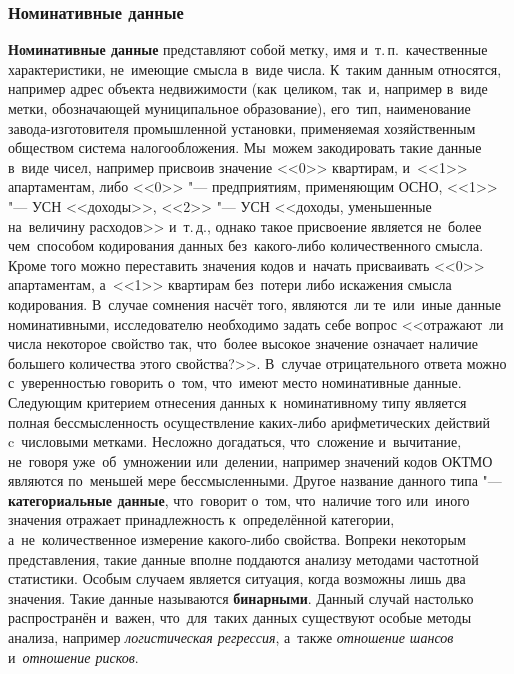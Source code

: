 \documentclass[]{scrartcl}
\begin{document}
\subsubsection{Номинативные данные}
\textbf{Номинативные данные} представляют собой метку, имя и~т.\,п.~качественные характеристики, не~имеющие смысла в~виде числа. К~таким данным относятся, например адрес объекта недвижимости (как~целиком, так~и, например в~виде метки, обозначающей муниципальное образование), его~тип, наименование завода-изготовителя промышленной установки, применяемая хозяйственным обществом система налогообложения. Мы~можем закодировать такие данные в~виде чисел, например присвоив значение <<0>> квартирам, и~<<1>> апартаментам, либо <<0>> "--- предприятиям, применяющим ОСНО, <<1>> "--- УСН <<доходы>>, <<2>> "--- УСН <<доходы, уменьшенные на~величину расходов>> и~т.\,д., однако такое присвоение является не~более чем~способом кодирования данных без~какого-либо количественного смысла. Кроме того можно переставить значения кодов и~начать присваивать <<0>> апартаментам, а~<<1>> квартирам без~потери либо искажения смысла кодирования. В~случае сомнения насчёт того, являются~ли те~или~иные данные номинативными, исследователю необходимо задать себе вопрос <<отражают~ли числа некоторое свойство так, что~более высокое значение означает наличие большего количества этого свойства?>>. В~случае отрицательного ответа можно с~уверенностью говорить о~том, что~имеют место номинативные данные. Следующим критерием отнесения данных к~номинативному типу является полная бессмысленность осуществление каких-либо арифметических действий c~числовыми метками. Несложно догадаться, что~сложение и~вычитание, не~говоря уже~об~умножении или~делении, например значений кодов ОКТМО являются по~меньшей мере бессмысленными.  Другое название данного типа "--- \textbf{категориальные данные}, что~говорит о~том, что~наличие того или~иного значения отражает принадлежность к~определённой категории, а~не~количественное измерение какого-либо свойства. Вопреки некоторым представления, такие данные вполне поддаются анализу методами частотной статистики. Особым случаем является ситуация, когда возможны лишь два значения. Такие данные называются \textbf{бинарными}. Данный случай настолько распространён и~важен, что~для~таких данных существуют особые методы анализа, например \emph{логистическая регрессия}, а~также \emph{отношение шансов} и~\emph{отношение рисков}.
\end{document}
